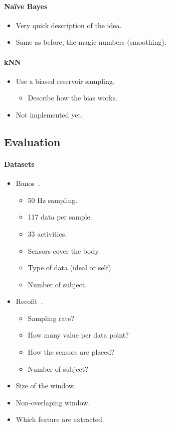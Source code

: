 \paragraph{Naïve Bayes~\cite{naive_bayes}}
\begin{itemize}
	\item Very quick description of the idea.
	\item Same as before, the magic numbers (smoothing).
\end{itemize}
\paragraph{kNN~\cite{biased_reservoir_sampling}}
\begin{itemize}
	\item Use a biased reservoir sampling.
	\begin{itemize}
		\item Describe how the bias works.
	\end{itemize}
	\item Not implemented yet.
\end{itemize}

\subsection{Evaluation}
\paragraph{Datasets}
\begin{itemize}
	\item Banos~\cite{Banos_2014}.
	\begin{itemize}
		\item 50 Hz sampling.
		\item 117 data per sample.
		\item 33 activities.
		\item Sensors cover the body.
		\item Type of data (ideal or self)
		\item Number of subject.
	\end{itemize}
	\item Recofit~\cite{recofit}.
	\begin{itemize}
		\item Sampling rate?
		\item How many value per data point?
		\item How the sensors are placed?
		\item Number of subject?
	\end{itemize}
	\item Size of the window.
	\item Non-overlaping window.
	\item Which feature are extracted.
\end{itemize}

